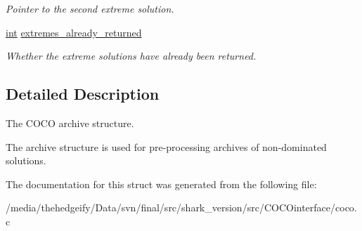 \begin{DoxyCompactItemize}
\begin{DoxyCompactList}\small\item\em Pointer to the second extreme solution. \end{DoxyCompactList}\item 
\hyperlink{classint}{int} \hyperlink{structcoco__archive__s_a6a64aa18920abb788daef2d93817a656}{extremes\+\_\+already\+\_\+returned}\hypertarget{structcoco__archive__s_a6a64aa18920abb788daef2d93817a656}{}\label{structcoco__archive__s_a6a64aa18920abb788daef2d93817a656}

\begin{DoxyCompactList}\small\item\em Whether the extreme solutions have already been returned. \end{DoxyCompactList}\end{DoxyCompactItemize}


\subsection{Detailed Description}
The C\+O\+CO archive structure. 

The archive structure is used for pre-\/processing archives of non-\/dominated solutions. 

The documentation for this struct was generated from the following file\+:\begin{DoxyCompactItemize}
\item 
/media/thehedgeify/\+Data/svn/final/src/shark\+\_\+version/src/\+C\+O\+C\+Ointerface/coco.\+c\end{DoxyCompactItemize}
